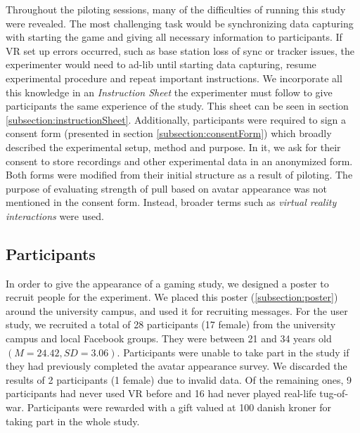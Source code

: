 Throughout the piloting sessions, many of the difficulties of running this study were revealed. The most challenging task would be synchronizing data capturing with starting the game and giving all necessary information to participants. If VR set up errors occurred, such as base station loss of sync or tracker issues, the experimenter would need to ad-lib until starting data capturing, resume experimental procedure and repeat important instructions. We incorporate all this knowledge in an \textit{Instruction Sheet} the experimenter must follow to give participants the same experience of the study. This sheet can be seen in section \ref{subsection:instructionSheet}. Additionally, participants were required to sign a consent form (presented in section \ref{subsection:consentForm}) which broadly described the experimental setup, method and purpose. In it, we ask for their consent to store recordings and other experimental data in an anonymized form. Both forms were modified from their initial structure as a result of piloting. The purpose of evaluating strength of pull based on avatar appearance was not mentioned in the consent form. Instead, broader terms such as \textit{virtual reality interactions} were used.


\subsection{Participants}
\label{subsection:participantsExperiment}
In order to give the appearance of a gaming study, we designed a poster to recruit people for the experiment. We placed this poster (\ref{subsection:poster}) around the university campus, and  used it for recruiting messages. For the user study, we recruited a total of 28 participants (17 female) from the university campus and local Facebook groups. They were between 21 and 34 years old $(M = 24.42, SD = 3.06)$. Participants were unable to take part in the study if they had previously completed the avatar appearance survey. We discarded the results of 2 participants (1 female) due to invalid data. Of the remaining ones, 9 participants had never used VR before and 16 had never played real-life tug-of-war. Participants were rewarded with a gift valued at 100 danish kroner for taking part in the whole study.

